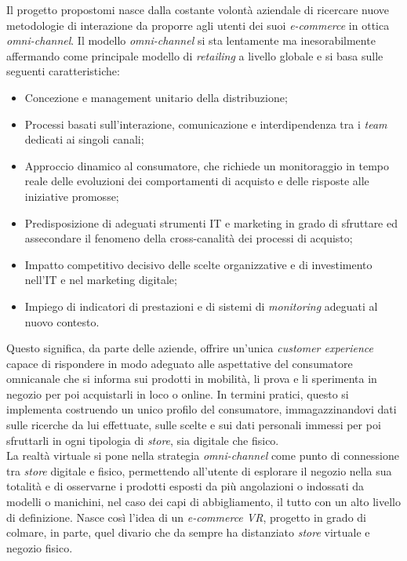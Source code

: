 Il progetto propostomi nasce dalla costante volontà aziendale di ricercare nuove metodologie di interazione da proporre agli utenti dei suoi \textit{e-commerce} in ottica \textit{omni-channel}. Il modello \textit{omni-channel} si sta lentamente ma inesorabilmente affermando come principale modello di \textit{retailing} a livello globale e si basa sulle seguenti caratteristiche:

\begin{itemize}
	\item Concezione e management unitario della distribuzione;
	\item Processi basati sull'interazione, comunicazione e interdipendenza tra i \textit{team} dedicati ai singoli canali;
	\item Approccio dinamico al consumatore, che richiede un monitoraggio in tempo reale delle evoluzioni dei comportamenti di acquisto e delle risposte alle iniziative promosse;
	\item Predisposizione di adeguati strumenti IT e marketing in grado di sfruttare ed assecondare il fenomeno della cross-canalità dei processi di acquisto;
	\item Impatto competitivo decisivo delle scelte organizzative e di investimento nell'IT e nel marketing digitale;
	\item Impiego di indicatori di prestazioni e di sistemi di \textit{monitoring} adeguati al nuovo contesto.
\end{itemize}

Questo significa, da parte delle aziende, offrire un'unica \textit{customer experience} capace di rispondere in modo adeguato alle aspettative del consumatore omnicanale che si informa sui prodotti in mobilità, li prova e li sperimenta in negozio per poi acquistarli in loco o online. In termini pratici, questo si implementa costruendo un unico profilo del consumatore, immagazzinandovi dati sulle ricerche da lui effettuate, sulle scelte e sui dati personali immessi per poi sfruttarli in ogni tipologia di \textit{store}, sia digitale che fisico. \\
La realtà virtuale si pone nella strategia \textit{omni-channel} come punto di connessione tra \textit{store} digitale e fisico, permettendo all'utente di esplorare il negozio nella sua totalità e di osservarne i prodotti esposti da più angolazioni o indossati da modelli o manichini, nel caso dei capi di abbigliamento, il tutto con un alto livello di definizione. 
Nasce così l'idea di un \textit{e-commerce VR}, progetto in grado di colmare, in parte, quel divario che da sempre ha distanziato \textit{store} virtuale e negozio fisico.

